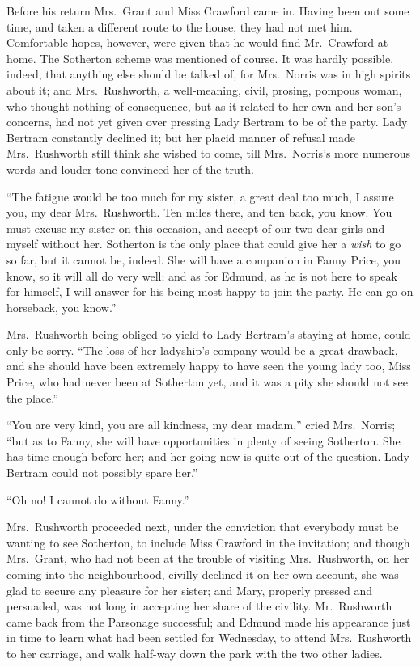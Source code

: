 Before his return Mrs.\ Grant and Miss Crawford came in.
Having been out some time, and taken a different route
to the house, they had not met him.  Comfortable hopes,
however, were given that he would find Mr.\ Crawford
at home.  The Sotherton scheme was mentioned of course.
It was hardly possible, indeed, that anything else should
be talked of, for Mrs.\ Norris was in high spirits about it;
and Mrs.\ Rushworth, a well-meaning, civil, prosing,
pompous woman, who thought nothing of consequence, but as it
related to her own and her son's concerns, had not yet
given over pressing Lady Bertram to be of the party.
Lady Bertram constantly declined it; but her placid manner
of refusal made Mrs.\ Rushworth still think she wished
to come, till Mrs.\ Norris's more numerous words and louder
tone convinced her of the truth.

``The fatigue would be too much for my sister, a great
deal too much, I assure you, my dear Mrs.\ Rushworth.
Ten miles there, and ten back, you know.  You must
excuse my sister on this occasion, and accept of our
two dear girls and myself without her.  Sotherton is
the only place that could give her a \emph{wish} to go so far,
but it cannot be, indeed.  She will have a companion
in Fanny Price, you know, so it will all do very well;
and as for Edmund, as he is not here to speak for himself,
I will answer for his being most happy to join the party.
He can go on horseback, you know.''

Mrs.\ Rushworth being obliged to yield to Lady Bertram's
staying at home, could only be sorry.  ``The loss of her
ladyship's company would be a great drawback, and she
should have been extremely happy to have seen the young
lady too, Miss Price, who had never been at Sotherton yet,
and it was a pity she should not see the place.''

``You are very kind, you are all kindness, my dear madam,''
cried Mrs.\ Norris; ``but as to Fanny, she will have
opportunities in plenty of seeing Sotherton.  She has
time enough before her; and her going now is quite out
of the question.  Lady Bertram could not possibly spare her.''

``Oh no!  I cannot do without Fanny.''

Mrs.\ Rushworth proceeded next, under the conviction that
everybody must be wanting to see Sotherton, to include
Miss Crawford in the invitation; and though Mrs.\ Grant,
who had not been at the trouble of visiting Mrs.\ Rushworth,
on her coming into the neighbourhood, civilly declined it
on her own account, she was glad to secure any pleasure
for her sister; and Mary, properly pressed and persuaded,
was not long in accepting her share of the civility.
Mr.\ Rushworth came back from the Parsonage successful;
and Edmund made his appearance just in time to learn what
had been settled for Wednesday, to attend Mrs.\ Rushworth
to her carriage, and walk half-way down the park with the two
other ladies.

